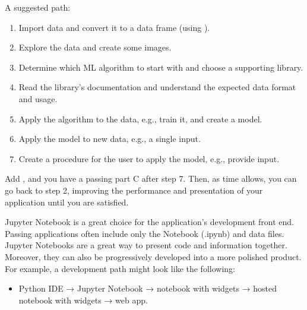 \documentclass[letterpaper,10pt,english]{jupyterBook}
\begin{document}
\sphinxAtStartPar
A suggested path:
\begin{enumerate}
%
\item {} 
\sphinxAtStartPar
Import data and convert it to a data frame (using ).

\item {} 
\sphinxAtStartPar
Explore the data and create some images.

\item {} 
\sphinxAtStartPar
Determine which ML algorithm to start with and choose a supporting library.

\item {} 
\sphinxAtStartPar
Read the library’s documentation and understand the expected data format and usage.

\item {} 
\sphinxAtStartPar
Apply the algorithm to the data, e.g., train it, and create a model.

\item {} 
\sphinxAtStartPar
Apply the model to new data, e.g., a single input.

\item {} 
\sphinxAtStartPar
Create a procedure for the user to apply the model, e.g., provide input.

\end{enumerate}

\sphinxAtStartPar
Add {\hyperref[\detokenize{task2_c/example_sup_class/sup_class_ex-process:sup-class-ex-descriptive-methods-and-visualizations}]{}}, and you have a passing part C after step 7. Then, as time allows, you can go back to step 2, improving the performance and presentation of your application until you are satisfied.

\sphinxAtStartPar
Jupyter Notebook is a great choice for the application’s development  front end. Passing applications often include only the Notebook (.ipynb) and data files. Jupyter Notebooks are a great way to present code and information together. Moreover, they can also be progressively developed into a more polished product. For example, a development path might look like the following:
\begin{itemize}
\item {} 
\sphinxAtStartPar
Python IDE → Jupyter Notebook → notebook with widgets → hosted notebook with widgets → web app.

\end{itemize}
\end{document}
